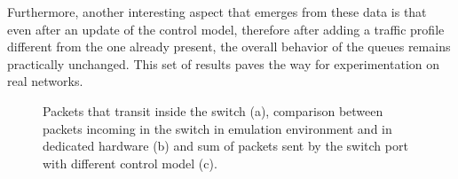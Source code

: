Furthermore, another interesting aspect that emerges from these data is that even after an update of the control model, therefore after adding a traffic profile different from the one already present, the overall behavior of the queues remains practically unchanged. This set of results paves the way for experimentation on real networks.
\begin{figure}[H]
\centering
{}
\caption{Packets that transit inside the switch (a), comparison between packets incoming in the switch in emulation environment and in dedicated hardware (b) and sum of packets sent by the switch port with different control model (c).}
\label{fig:PKTS_REAL}
\end{figure}
\
